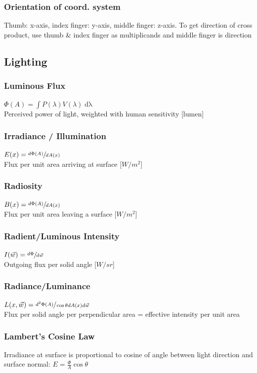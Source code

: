 \documentclass[a4paper,10pt]{article}
\begin{document}
\subsubsection{Orientation of coord. system}
Thumb: x-axis, index finger: y-axis, middle finger: z-axis. To get direction of cross product, use thumb \& index finger as multiplicands and middle finger is direction

\subsection{Lighting}
\subsubsection{Luminous Flux} \( \Phi(A) = \int P(\lambda)V(\lambda) \mathop{d\lambda} \) \\
Perceived power of light, weighted with human sensitivity [lumen] 
\subsubsection{Irradiance / Illumination} \( E(x) = \sfrac{d \Phi(A)}{dA(x)} \) \\
Flux per unit area arriving at surface [\( \unit{W /m^2} \)]
\subsubsection{Radiosity} \( B(x) = \sfrac{d \Phi (A)}{dA(x)} \) \\
Flux per unit area leaving a surface [\( \unit{W/m^2} \)]
\subsubsection{Radient/Luminous Intensity} \( I(\vec{w}) = \sfrac{d \Phi}{d \vec{w}} \) \\
Outgoing flux per solid angle [\( \unit{W/sr} \)]
\subsubsection{Radiance/Luminance} \( L(x, \vec{w}) = \sfrac{d^2 \Phi (A)}{\cos \theta d A(x) d \vec{w}} \) \\
Flux per solid angle per perpendicular area = effective intensity per unit area
\subsubsection{Lambert's Cosine Law} Irradiance at surface is proportional to cosine of angle between light direction and surface normal: \( E = \frac{\Phi}{A} \cos \theta  \)
\end{document}
